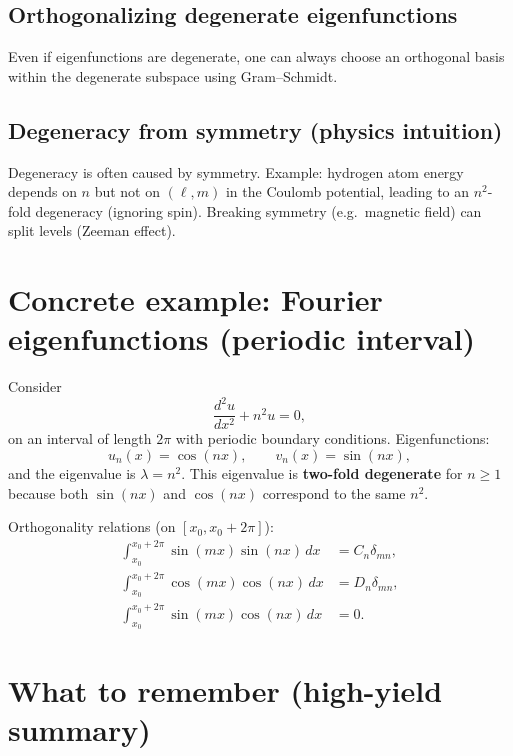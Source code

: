 \subsection{Orthogonalizing degenerate eigenfunctions}
Even if eigenfunctions are degenerate, one can always choose an orthogonal basis
within the degenerate subspace using Gram--Schmidt.

\subsection{Degeneracy from symmetry (physics intuition)}
Degeneracy is often caused by symmetry.
Example: hydrogen atom energy depends on $n$ but not on $(\ell,m)$ in the Coulomb potential,
leading to an $n^2$-fold degeneracy (ignoring spin).
Breaking symmetry (e.g.\ magnetic field) can split levels (Zeeman effect).


\section{Concrete example: Fourier eigenfunctions (periodic interval)}

Consider
\begin{equation}
\frac{d^2u}{dx^2} + n^2u = 0,
\end{equation}
on an interval of length $2\pi$ with periodic boundary conditions.
Eigenfunctions:
\begin{equation}
u_n(x)=\cos(nx),\qquad v_n(x)=\sin(nx),
\end{equation}
and the eigenvalue is $\lambda=n^2$.
This eigenvalue is \textbf{two-fold degenerate} for $n\ge 1$ because both $\sin(nx)$ and
$\cos(nx)$ correspond to the same $n^2$.

Orthogonality relations (on $[x_0,x_0+2\pi]$):
\begin{align}
\int_{x_0}^{x_0+2\pi}\sin(mx)\sin(nx)\,dx &= C_n\delta_{mn},\\
\int_{x_0}^{x_0+2\pi}\cos(mx)\cos(nx)\,dx &= D_n\delta_{mn},\\
\int_{x_0}^{x_0+2\pi}\sin(mx)\cos(nx)\,dx &= 0.
\end{align}


\section{What to remember (high-yield summary)}

